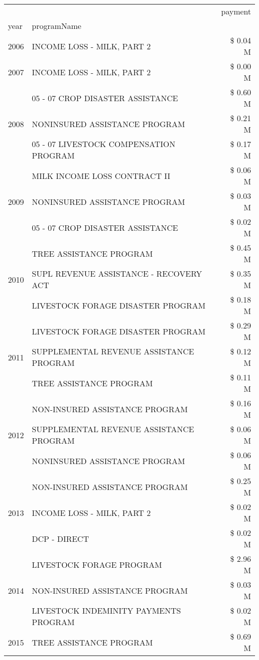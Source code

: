 \begin{tabular}{llr}
\toprule
 &  & payment \\
year & programName &  \\
\midrule
2006 & INCOME LOSS - MILK, PART 2 & \$ 0.04 M \\
\cline{1-3}
2007 & INCOME LOSS - MILK, PART 2 & \$ 0.00 M \\
\cline{1-3}
\multirow[t]{3}{*}{2008} & 05 - 07 CROP DISASTER ASSISTANCE & \$ 0.60 M \\
 & NONINSURED ASSISTANCE PROGRAM & \$ 0.21 M \\
 & 05 - 07 LIVESTOCK COMPENSATION PROGRAM & \$ 0.17 M \\
\cline{1-3}
\multirow[t]{3}{*}{2009} & MILK INCOME LOSS CONTRACT II & \$ 0.06 M \\
 & NONINSURED ASSISTANCE PROGRAM & \$ 0.03 M \\
 & 05 - 07 CROP DISASTER ASSISTANCE & \$ 0.02 M \\
\cline{1-3}
\multirow[t]{3}{*}{2010} & TREE ASSISTANCE PROGRAM & \$ 0.45 M \\
 & SUPL REVENUE ASSISTANCE - RECOVERY ACT & \$ 0.35 M \\
 & LIVESTOCK FORAGE DISASTER PROGRAM & \$ 0.18 M \\
\cline{1-3}
\multirow[t]{3}{*}{2011} & LIVESTOCK FORAGE DISASTER PROGRAM & \$ 0.29 M \\
 & SUPPLEMENTAL REVENUE ASSISTANCE PROGRAM & \$ 0.12 M \\
 & TREE ASSISTANCE PROGRAM & \$ 0.11 M \\
\cline{1-3}
\multirow[t]{3}{*}{2012} & NON-INSURED ASSISTANCE PROGRAM & \$ 0.16 M \\
 & SUPPLEMENTAL REVENUE ASSISTANCE PROGRAM & \$ 0.06 M \\
 & NONINSURED ASSISTANCE PROGRAM & \$ 0.06 M \\
\cline{1-3}
\multirow[t]{3}{*}{2013} & NON-INSURED ASSISTANCE PROGRAM & \$ 0.25 M \\
 & INCOME LOSS - MILK, PART 2 & \$ 0.02 M \\
 & DCP - DIRECT & \$ 0.02 M \\
\cline{1-3}
\multirow[t]{3}{*}{2014} & LIVESTOCK FORAGE PROGRAM & \$ 2.96 M \\
 & NON-INSURED ASSISTANCE PROGRAM & \$ 0.03 M \\
 & LIVESTOCK INDEMINITY PAYMENTS PROGRAM & \$ 0.02 M \\
\cline{1-3}
\multirow[t]{3}{*}{2015} & TREE ASSISTANCE PROGRAM & \$ 0.69 M \\

\end{tabular}
